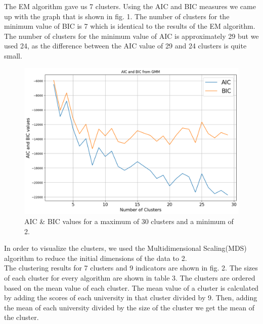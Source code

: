 \documentclass[conference]{IEEEtran}
\begin{document}
The EM algorithm gave us 7 clusters. Using the AIC and BIC measures we came up with the graph that is shown in fig. 1. The number of clusters for the minimum value of BIC is 7 which is identical to the results of the EM algorithm. The number of clusters for the minimum value of AIC is approximately 29 but we used 24, as the difference between the AIC value of 29 and 24 clusters is quite small. \\


\begin{figure}[htbp]
\centerline{\includegraphics[scale=0.32]{AIC_BIC_NoWeights.png}}
\caption{AIC \& BIC values for a maximum of 30 clusters and a minimum of 2.}
\label{fig1}
\end{figure}

In order to visualize the clusters, we used the Multidimensional Scaling(MDS) algorithm \cite{b14} to reduce the initial dimensions of the data to 2. \\
The clustering results for 7 clusters and 9 indicators are shown in fig. 2. The sizes of each cluster for every algorithm are shown in table 3. The clusters are ordered based on the mean value of each cluster. The mean value of a cluster is calculated by adding the scores of each university in that cluster divided by 9. Then, adding the mean of each university divided by the size of the cluster we get the mean of the cluster. \\
\end{document}
